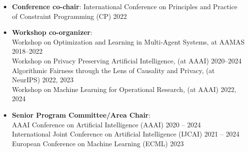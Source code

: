 \documentclass[localFont,alternative]{documentMETADATA}
\begin{document}

  \begin{itemize}
    \item {\bf Conference co-chair}:  
    {International Conference on Principles and Practice of Constraint Programming (CP)}  \hfill{2022}


    \item {\bf Workshop co-organizer}: \\
    {Workshop on Optimization and Learning in Multi-Agent Systems, at AAMAS} \hfill{2018--2022}\\
    {Workshop on Privacy Preserving Artificial Intelligence, (at AAAI)}   \hfill{2020--2024}\\
    {Algorithmic Fairness through the Lens of Causality and Privacy, (at NeurIPS)} \hfill{2022, 2023}\\
    {Workshop on Machine Learning for Operational Research, (at AAAI)}   \hfill{2022, 2024}
    
    \item {\bf Senior Program Committee/Area Chair}: \\
    AAAI Conference on Artificial Intelligence (AAAI) \hfill {2020 -- 2024}\\
    International Joint Conference on Artificial Intelligence (IJCAI) \hfill {2021 -- 2024}\\
    European Conference on Machine Learning (ECML) \hfill{2023}


 
  \end{itemize}
\end{document}

